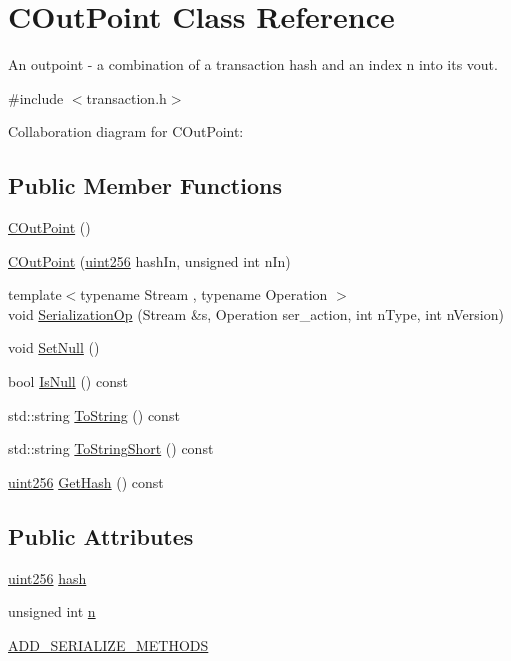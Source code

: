 \hypertarget{class_c_out_point}{}\section{C\+Out\+Point Class Reference}
\label{class_c_out_point}


An outpoint -\/ a combination of a transaction hash and an index n into its vout.  




{\ttfamily \#include $<$transaction.\+h$>$}



Collaboration diagram for C\+Out\+Point\+:
\subsection*{Public Member Functions}
\begin{DoxyCompactItemize}
\item 
\hyperlink{class_c_out_point_a4912217c2fe5e353d9f5546abb377e86}{C\+Out\+Point} ()
\item 
\hyperlink{class_c_out_point_a59286d6685530ba330943198e6f81812}{C\+Out\+Point} (\hyperlink{classuint256}{uint256} hash\+In, unsigned int n\+In)
\item 
{\footnotesize template$<$typename Stream , typename Operation $>$ }\\void \hyperlink{class_c_out_point_a171ccb3afa9bf9443a91e5ba3fdb911b}{Serialization\+Op} (Stream \&s, Operation ser\+\_\+action, int n\+Type, int n\+Version)
\item 
void \hyperlink{class_c_out_point_aa98ceceb3fc5f4d2c52033451ee8e251}{Set\+Null} ()
\item 
bool \hyperlink{class_c_out_point_acd3225f1bb5550af0b900cd0dd7112d9}{Is\+Null} () const 
\item 
std\+::string \hyperlink{class_c_out_point_afcfc33fde94fce212e99099c78162612}{To\+String} () const 
\item 
std\+::string \hyperlink{class_c_out_point_a2998c059602a32046dda180603fcfb65}{To\+String\+Short} () const 
\item 
\hyperlink{classuint256}{uint256} \hyperlink{class_c_out_point_ab63a99ac182d5174f568addf5db35162}{Get\+Hash} () const 
\end{DoxyCompactItemize}
\subsection*{Public Attributes}
\begin{DoxyCompactItemize}
\item 
\hyperlink{classuint256}{uint256} \hyperlink{class_c_out_point_af131c7194a660558b0ff158f4efa7a28}{hash}
\item 
unsigned int \hyperlink{class_c_out_point_a9fbc648ca0d11421ad66e897185a9b58}{n}
\item 
\hyperlink{class_c_out_point_ac025da4b121ed1bca9a4d88bcb9d3a90}{A\+D\+D\+\_\+\+S\+E\+R\+I\+A\+L\+I\+Z\+E\+\_\+\+M\+E\+T\+H\+O\+D\+S}
\end{DoxyCompactItemize}
